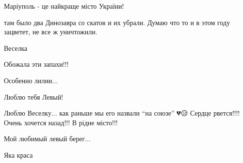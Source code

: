 
Маріуполь - це найкраще місто України!


там было два Динозавра со скатов и их убрали. Думаю что то и в этом году
зацветет, не все ж уничтожили.


Веселка


Обожала эти запахи!!!💐

Особенно лилии...💖

Люблю тебя Левый!

Люблю Веселку... как раньше мы его назвали \enquote{на союзе} 💔😥 Сердце
рвется!!!! Очень хочется назад!!! В рідне місто!!!💛💙


Мой любимый левый берег...


Яка краса
